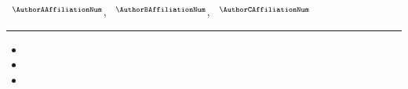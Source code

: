 
\begin{flushleft}
    {\small \sffamily \MakeUppercase{\DocType}}\\[4mm]

    {\Large \sffamily\bfseries \DocTitle}\\[6mm]

    {\normalsize \rmfamily
    \AuthorAName\ \AuthorALastName$^{\AuthorAAffiliationNum\ifdefstring{\AuthorACorresponding}{true}{,\ast}{}}$,
    \AuthorBName\ \AuthorBLastName$^{\AuthorBAffiliationNum\ifdefstring{\AuthorBCorresponding}{true}{,\ast}{}}$,
    \AuthorCName\ \AuthorCLastName$^{\AuthorCAffiliationNum\ifdefstring{\AuthorCCorresponding}{true}{,\ast}{}}$
    }
\end{flushleft}

{\renewcommand{\thefootnote}{}%
}

\vspace{4mm}

\rule{\linewidth}{1pt}

\vspace{4mm}

{\linespread{0.85}\selectfont
\begin{itemize}
    \setlength\itemsep{0mm}
    \item {\footnotesize \sffamily \DocHighlightOne}
    \item {\footnotesize \sffamily \DocHighlightTwo}
    \item {\footnotesize \sffamily \DocHighlightThree}
\end{itemize}
}

